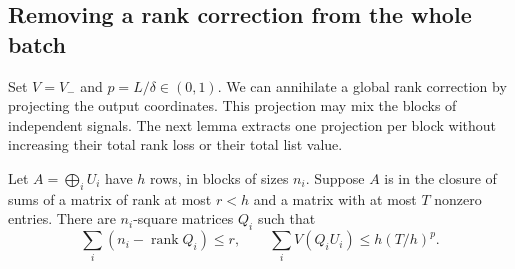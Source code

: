 \subsection{Removing a rank correction from the whole batch}

Set $V=V_-$ and $p=L/\delta\in(0,1)$. We can annihilate a global
rank correction by projecting the output coordinates. This projection
may mix the blocks of independent signals. The next lemma extracts
one projection per block without increasing their total rank loss
or their total list value.

\begin{lemma}\label{bch:quotient-test}
Let $A=\bigoplus_i U_i$ have $h$ rows, in blocks of sizes $n_i$.
Suppose $A$ is in the closure of sums of a matrix of rank at most $r<h$
and a matrix with at most $T$ nonzero entries. There are $n_i$-square
matrices $Q_i$ such that
\[
 \sum_i(n_i-\operatorname{rank} Q_i)\le r,\qquad
 \sum_i V(Q_iU_i)\le h(T/h)^p .
\]
\end{lemma}

